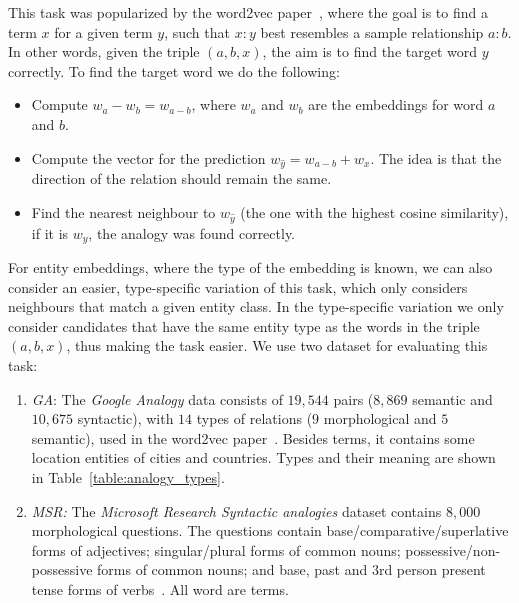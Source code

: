 This task was popularized by the word2vec paper~, where the goal is to find a term $x$ for a given term $y$, such that  $x : y$ best resembles a sample relationship $a : b$. In other words, given the triple $(a,b,x)$, the aim is to find the target word $y$ correctly. To find the target word we do the following:  
\begin{itemize}
    \item Compute $w_a-w_b=w_{a-b}$, where $w_a$ and $w_b$ are the embeddings for word $a$ and $b$. 
    \item Compute the vector for the prediction $w_{\hat{y}}=w_{a-b}+w_x$. The idea is that the direction of the relation should remain the same.
    \item Find the nearest neighbour to $w_{\hat{y}}$ (the one with the highest cosine similarity), if it is $w_y$, the analogy was found correctly.
  \end{itemize}
  \noindent
For entity embeddings, where the type of the embedding is known, we can also consider an easier, type-specific variation of this task, which only considers neighbours that match a given entity class. In the type-specific variation we only consider candidates that have the same entity type as the words in the triple $(a,b,x)$, thus making the task easier. We use two dataset for evaluating this task: 
\begin{enumerate}
 \item \emph{GA}: The \emph{Google Analogy} data consists of $19,544$ pairs ($8,869$ semantic and $10,675$ syntactic), with $14$ types of relations ($9$ morphological and $5$ semantic), used in the word2vec paper~. Besides terms, it contains some location entities of cities and countries. Types and their meaning are shown in Table~\ref{table:analogy_types}.
\item \emph{MSR:} The \emph{Microsoft Research Syntactic analogies} dataset contains $8,000$ morphological questions. The questions contain base/comparative/superlative forms of adjectives; singular/plural forms of common nouns; possessive/non-possessive forms of common nouns; and base, past and 3rd person present tense forms of verbs~. All word are terms.
\end{enumerate}


